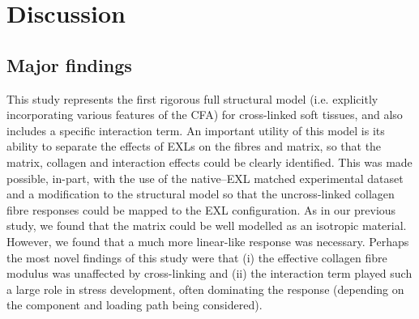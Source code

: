 \section{Discussion}

\subsection{Major findings}

    This study represents the first rigorous full structural model (i.e. explicitly incorporating various features of the CFA) for cross-linked soft tissues, and also includes a specific interaction term. An important utility of this model is its ability to separate the effects of EXLs on the fibres and matrix, so that the matrix, collagen and interaction effects could be clearly identified. This was made possible, in-part, with the use of the native–EXL matched experimental dataset and a modification to the structural model so that the uncross-linked collagen fibre responses could be mapped to the EXL configuration. As in our previous study, we found that the matrix could be well modelled as an isotropic material. However, we found that a much more linear-like response was necessary. Perhaps the most novel findings of this study were that (i) the effective collagen fibre modulus was unaffected by cross-linking and (ii) the interaction term played such a large role in stress development, often dominating the response (depending on the component and loading path being considered).
    
